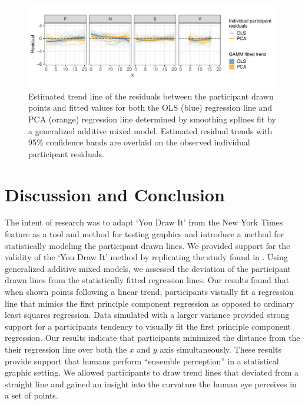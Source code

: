 \documentclass[12pt]{article}
\begin{document}
\begin{figure}[tbp]

{\centering \includegraphics[width=1\linewidth,]{Eye-Fitting-Straight-Lines-in-the-Modern-Era_files/figure-latex/eyefitting-gamm-residualplots-1} 

}

\caption{Estimated trend line of the residuals between the participant drawn points and fitted values for both the OLS (blue) regression line and PCA (orange) regression line determined by smoothing splines fit by a generalized additive mixed model. Estimated residual trends with 95\% confidence bands are overlaid on the observed individual participant residuals.}\label{fig:eyefitting-gamm-residualplots}
\end{figure}

\hypertarget{discussion-and-conclusion}{%
\section{Discussion and Conclusion}\label{discussion-and-conclusion}}

The intent of research was to adapt `You Draw It' from the New York
Times feature as a tool and method for testing graphics and introduce a
method for statistically modeling the participant drawn lines. We
provided support for the validity of the `You Draw It' method by
replicating the study found in \citet{mosteller1981eye}. Using
generalized additive mixed models, we assessed the deviation of the
participant drawn lines from the statistically fitted regression lines.
Our results found that when shown points following a linear trend,
participants visually fit a regression line that mimics the first
principle component regression as opposed to ordinary least squares
regression. Data simulated with a larger variance provided strong
support for a participants tendency to visually fit the first principle
component regression. Our results indicate that participants minimized
the distance from the their regression line over both the \(x\) and
\(y\) axis simultaneously. These results provide support that humans
perform ``ensemble perception'' in a statistical graphic setting. We
allowed participants to draw trend lines that deviated from a straight
line and gained an insight into the curvature the human eye perceives in
a set of points.
\end{document}

